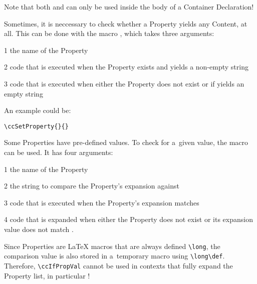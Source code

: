 Note that both \UsageMacro{\ccDeclareType} and \UsageMacro{\ccInherit}
can only be used inside the body of a Container Declaration!











Sometimes, it is neccessary to check whether a Property yields any
Content, at all. This can be done with the macro
\DescribeMacro{\ccIfProp}, which takes three arguments:
\begin{ArgList}
\item[1] the name of the Property
\item[2] code that is executed when the Property exists and yields a
  non-empty string
\item[3] code that is executed when either the Property does not exist
  or if yields an empty string
\end{ArgList}
An example could be:
\begin{lstlisting}
\ccSetProperty{}{}
\end{lstlisting}

Some Properties have pre-defined values. To check for a~given value,
the macro \DescribeMacro{\ccIfPropVal} can be used. It has four
arguments:
\begin{ArgList}
\item[1] the name of the Property
\item[2] the string to compare the Property's expansion against
\item[3] code that is executed when the Property's expansion matches
\item[4] code that is expanded when either the Property does not exist
  or its expansion value does not match .
\end{ArgList}
\begin{Warning}
  Since Properties are LaTeX macros that are always defined
  \lstinline{\long}, the comparison value  is also stored
  in a~temporary macro using \lstinline{\long\def}. Therefore,
  \lstinline{\ccIfPropVal} cannot be used in contexts that fully
  expand the Property list, in particular
  \UsageMacro{\ccApplyCollection}!
\end{Warning}
